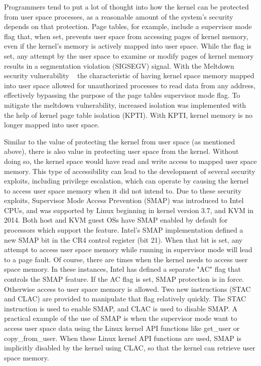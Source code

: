 \documentclass{report}
\begin{document}
\begin{spacing}{1.5}
{\large
Programmers tend to put a lot of thought into how the kernel can be protected from user space processes, as a reasonable amount of the system's security depends on that protection. Page tables, for example, include a supervisor mode flag that, when set, prevents user space from accessing pages of kernel memory, even if the kernel's memory is actively mapped into user space. While the flag is set, any attempt by the user space to examine or modify pages of kernel memory results in a segmentation violation (SIGSEGV) signal. With the Meltdown security vulnerability ~\cite{lipp2018meltdown} the characteristic of having kernel space memory mapped into user space allowed for unauthorized processes to read data from any address, effectively bypassing the purpose of the page tables supervisor mode flag. To mitigate the meltdown vulnerability, increased isolation was implemented with the help of kernel page table isolation (KPTI). With KPTI, kernel memory is no longer mapped into user space. 
\newline
}

{\large
\noindent Similar to the value of protecting the kernel from user space (as mentioned above), there is also value in protecting user space from the kernel. Without doing so, the kernel space would have read and write access to mapped user space memory. This type of accessibility can lead to the development of several security exploits, including privilege escalation, which can operate by causing the kernel to access user space memory when it did not intend to. Due to these security exploits, Supervisor Mode Access Prevention (SMAP) was introduced to Intel CPUs, and was supported by Linux beginning in kernel version 3.7, and KVM in 2014. Both host and KVM guest OSs have SMAP enabled by default for processors which support the feature. Intel's SMAP implementation defined a new SMAP bit in the CR4 control register (bit 21). When that bit is set, any attempt to access user space memory while running in supervisor mode will lead to a page fault. Of course, there are times when the kernel needs to access user space memory. In these instances, Intel has defined a separate "AC" flag that controls the SMAP feature. If the AC flag is set, SMAP protection is in force. Otherwise access to user space memory is allowed. Two new instructions (STAC and CLAC) are provided to manipulate that flag relatively quickly. The STAC instruction is used to enable SMAP, and CLAC is used to disable SMAP. A practical example of the use of SMAP is when the supervisor mode want to  access user space data using the Linux kernel API functions like get\_user or copy\_from\_user. When these Linux kernel API functions are used, SMAP is implicitly disabled by the kernel using CLAC, so that the kernel can retrieve user space memory.
\newline
}




\end{spacing}
\end{document}
